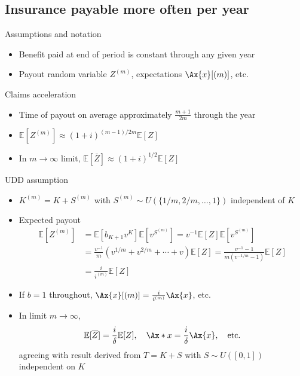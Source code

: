 \subsection{Insurance payable more often per year}

Assumptions and notation
\begin{itemize}
\item Benefit paid at end of period is constant through any given year
\item Payout random variable $Z^{(m)}$, expectations $\Ax{x}[(m)]$, etc.
\end{itemize}

Claims acceleration
\begin{itemize}
\item Time of payout on average approximately $\frac{m + 1}{2m}$ through the year
\item $\mathbb{E}[Z^{(m)}]\approx (1 + i)^{(m - 1)/2m}\mathbb{E}[Z]$
\item In $m\to\infty$ limit, $\mathbb{E}[\bar{Z}]\approx (1 + i)^{1/2}\mathbb{E}[Z]$
\end{itemize}

UDD assumption
\begin{itemize}
\item $K^{(m)} = K + S^{(m)}$ with $S^{(m)}\sim U(\{1/m, 2/m, \ldots, 1\})$ independent of $K$
\item Expected payout
\begin{align*}
\mathbb{E}[Z^(m)] &= \mathbb{E}[b_{K + 1}v^K]\mathbb{E}[v^{S^{(m)}}] = v^{-1}\mathbb{E}[Z]\mathbb{E}[v^{S^{(m)}}] \\
&= \frac{v^{-1}}{m}(v^{1/m} + v^{2/m} + \cdots + v)\mathbb{E}[Z] = \frac{v^{-1} - 1}{m(v^{-1/m} - 1)}\mathbb{E}[Z] \\
&= \frac{i}{i^{(m)}}\mathbb{E}[Z]
\end{align*}
\item If $b = 1$ throughout, $\Ax{x}[(m)] = \frac{i}{i^{(m)}}\Ax{x}$, etc.
\item In limit $m\to\infty$,
\begin{equation*}
\mathbb{E}[\bar{Z}] = \frac{i}{\delta}\mathbb{E}[Z],\quad\Ax*{x} = \frac{i}{\delta}\Ax{x},\quad\text{etc.}
\end{equation*}
agreeing with result derived from $T = K + S$ with $S\sim U([0,1])$ independent on $K$
\end{itemize}